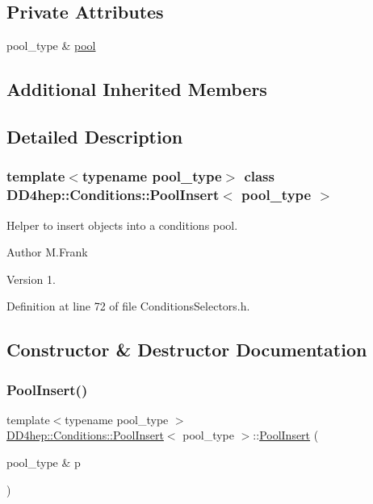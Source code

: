 \subsection*{Private Attributes}
\begin{DoxyCompactItemize}
\item 
pool\+\_\+type \& \hyperlink{class_d_d4hep_1_1_conditions_1_1_pool_insert_aba19eeaf8d2e0a226176234c454c6213}{pool}
\end{DoxyCompactItemize}
\subsection*{Additional Inherited Members}


\subsection{Detailed Description}
\subsubsection*{template$<$typename pool\+\_\+type$>$\newline
class D\+D4hep\+::\+Conditions\+::\+Pool\+Insert$<$ pool\+\_\+type $>$}

Helper to insert objects into a conditions pool. 

\begin{DoxyAuthor}{Author}
M.\+Frank 
\end{DoxyAuthor}
\begin{DoxyVersion}{Version}
1. 
\end{DoxyVersion}


Definition at line 72 of file Conditions\+Selectors.\+h.



\subsection{Constructor \& Destructor Documentation}
\hypertarget{class_d_d4hep_1_1_conditions_1_1_pool_insert_a577e9561b1733e791ad4218a289936c1}{}\label{class_d_d4hep_1_1_conditions_1_1_pool_insert_a577e9561b1733e791ad4218a289936c1} 
\subsubsection{\texorpdfstring{Pool\+Insert()}{PoolInsert()}}
{\footnotesize\ttfamily template$<$typename pool\+\_\+type $>$ \\
\hyperlink{class_d_d4hep_1_1_conditions_1_1_pool_insert}{D\+D4hep\+::\+Conditions\+::\+Pool\+Insert}$<$ pool\+\_\+type $>$\+::\hyperlink{class_d_d4hep_1_1_conditions_1_1_pool_insert}{Pool\+Insert} (\begin{DoxyParamCaption}\item[{pool\+\_\+type \&}]{p }\end{DoxyParamCaption})\hspace{0.3cm}{\ttfamily [inline]}}



